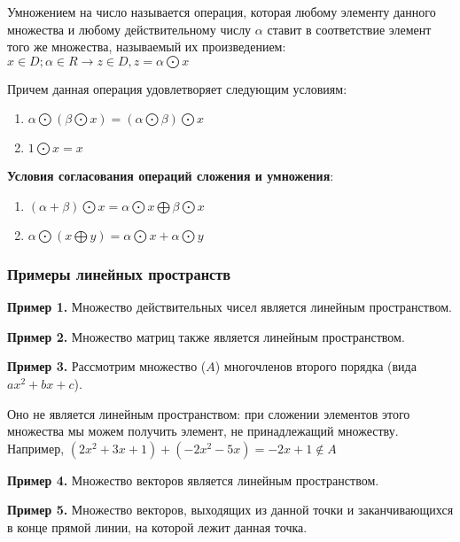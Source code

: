 \documentclass{article}
\begin{document}
\begin{flushleft}
\hfill

Умножением на число называется операция, которая любому элементу данного множества и любому действительному числу $\alpha$ ставит в соответствие элемент того же множества, называемый их произведением: $x \in D; \alpha \in R \rightarrow z \in D, z = \alpha \bigodot x$

Причем данная операция удовлетворяет следующим условиям:

\begin{enumerate}
    \item $\alpha \bigodot (\beta \bigodot x) = (\alpha \bigodot \beta) \bigodot x$
    \item $1 \bigodot x = x$
\end{enumerate}

\hfill

\textbf{Условия согласования операций сложения и умножения}:

\begin{enumerate}
    \item $(\alpha + \beta) \bigodot x = \alpha \bigodot x \bigoplus \beta \bigodot x$
    \item $\alpha \bigodot (x \bigoplus y) = \alpha \bigodot x + \alpha \bigodot y$
\end{enumerate}

\subsubsection{Примеры линейных пространств}

\textbf{Пример 1.} Множество действительных чисел является линейным пространством.

\hfill

\textbf{Пример 2.} Множество матриц также является линейным пространством.

\hfill

\textbf{Пример 3.} Рассмотрим множество ($A$) многочленов второго порядка (вида $ax^2 + bx + c$).

Оно не является линейным пространством: при сложении элементов этого множества мы можем получить элемент, не принадлежащий множеству. Например, $(2x^2 + 3x + 1) + (-2x^2 - 5x) = -2x + 1 \notin A$

\hfill

\textbf{Пример 4.} Множество векторов является линейным пространством.

\hfill

\textbf{Пример 5.} Множество векторов, выходящих из данной точки и заканчивающихся в конце прямой линии, на которой лежит данная точка.


\end{flushleft}
\end{document}
